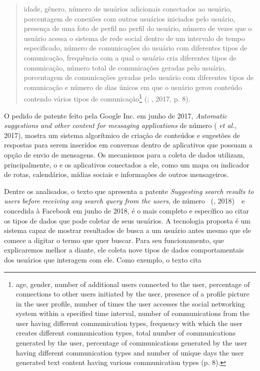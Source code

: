 \begin{quote}
idade, gênero, número de usuários adicionais conectados ao usuário,
porcentagem de conexões com outros usuários iniciados pelo usuário,
presença de uma foto de perfil no perfil do usuário, número de vezes que
o usuário acessa o sistema de rede social dentro de um intervalo de
tempo especificado, número de comunicações do usuário com diferentes
tipos de comunicação, frequência com a qual o usuário cria diferentes
tipos de comunicação, número total de comunicações geradas pelo usuário,
porcentagem de comunicações geradas pelo usuário com diferentes tipos de
comunicação e número de dias únicos em que o usuário gerou conteúdo
contendo vários tipos de comunicação\footnote{age, gender, number of
  additional users connected to the user, percentage of connections to
  other users initiated by the user, presence of a profile picture in
  the user profile, number of times the user accesses the social
  networking system within a specified time interval, number of
  communications from the user having different communication types,
  frequency with which the user creates different communication types,
  total number of communications generated by the user, percentage of
  communications generated by the user having different communication
  types and number of unique days the user generated text content having
  various communication types (p. 8).} (; , 2017, p. 8).
\end{quote}

O pedido de patente feito pela Google Inc. em junho de 2017,
\emph{Automatic suggestions and other content for messaging
applications} de número  ( \emph{et al.}, 2017),
mostra um sistema algorítmico de criação de conteúdos e sugestões de
respostas para serem inseridos em conversas dentro de aplicativos que
possuam a opção de envio de mensagens. Os mecanismos para a coleta de
dados utilizam, principalmente, o  e os aplicativos conectados a ele,
como um mapa ou indicador de rotas, calendários, mídias sociais e
informações de outros mensageiros.

Dentre os analisados, o texto que apresenta a patente \emph{Suggesting
search results to users before receiving any search query from the
users}, de número  ~(, 2018)~~e concedida
à Facebook em junho de 2018, é o mais completo e específico ao citar os
tipos de dados que pode coletar de seus usuários. A tecnologia proposta
é um sistema capaz de mostrar resultados de busca a um usuário antes
mesmo que ele comece a digitar o termo que quer buscar. Para seu
funcionamento, que explicaremos melhor a diante, ele coleta nove tipos
de dados comportamentais dos usuários que interagem com ele. Como
exemplo, o texto cita

